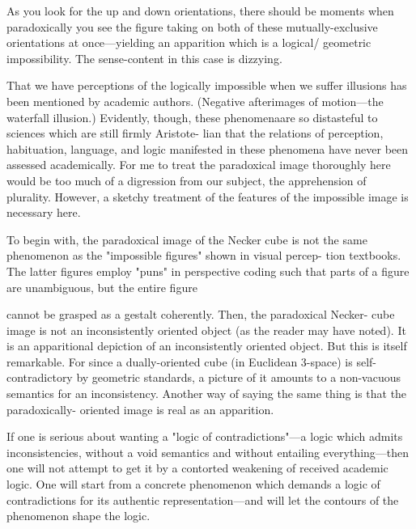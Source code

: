 As you look for the up and down orientations, there should be 
moments when paradoxically you see the figure taking on both of these 
mutually-exclusive orientations at once---yielding an apparition which 
is a logical/ geometric impossibility. The sense-content in this case is 
dizzying. 

That we have perceptions of the logically impossible when we 
suffer illusions has been mentioned by academic authors. (Negative 
afterimages of motion---the waterfall illusion.) Evidently, though, these 
phenomenaare so distasteful to sciences which are still firmly Aristote- 
lian that the relations of perception, habituation, language, and logic 
manifested in these phenomena have never been assessed academically. 
For me to treat the paradoxical image thoroughly here would be too 
much of a digression from our subject, the apprehension of plurality. 
However, a sketchy treatment of the features of the impossible image is 
necessary here. 

To begin with, the paradoxical image of the Necker cube is not the 
same phenomenon as the "impossible figures" shown in visual percep- 
tion textbooks. The latter figures employ "puns" in perspective coding 
such that parts of a figure are unambiguous, but the entire figure 


cannot be grasped as a gestalt coherently. Then, the paradoxical Necker- 
cube image is not an inconsistently oriented object (as the reader may 
have noted). It is an apparitional depiction of an inconsistently oriented 
object. But this is itself remarkable. For since a dually-oriented cube (in 
Euclidean 3-space) is self-contradictory by geometric standards, a 
picture of it amounts to a non-vacuous semantics for an inconsistency. 
Another way of saying the same thing is that the paradoxically- 
oriented image is real as an apparition. 

If one is serious about wanting a "logic of contradictions"---a logic 
which admits inconsistencies, without a void semantics and without 
entailing everything---then one will not attempt to get it by a contorted 
weakening of received academic logic. One will start from a concrete 
phenomenon which demands a logic of contradictions for its authentic 
representation---and will let the contours of the phenomenon shape the 
logic. 

